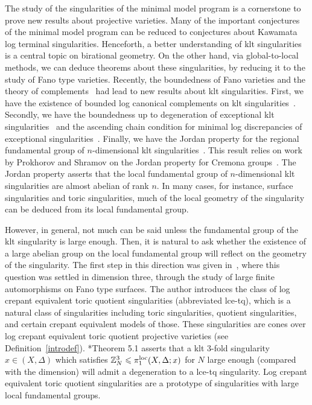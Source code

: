 \documentclass{amsart}
\newcommand{\zz}{\mathbb{Z}}
\theoremstyle{remark}
\numberwithin{equation}{section}
\begin{document}
The study of the singularities of the minimal model program
is a cornerstone to prove new results about projective varieties.
Many of the important conjectures of the minimal model program
can be reduced to conjectures about Kawamata log terminal singularities.
Henceforth, a better understanding of klt singularities is a central topic on birational geometry.
On the other hand, via global-to-local methods, we can deduce theorems about
these singularities, 
by reducing it to the study of Fano type varieties.
Recently, the boundedness of Fano varieties and the theory of complements~\cites{Bir16a,Bir16b}
had lead to new results about klt singularities.
First, we have the existence of bounded log canonical complements
on klt singularities~\cite{Bir16a}.
Secondly, we have the boundedness up to degeneration of exceptional klt singularities~\cites{Mor18b,HLM19} and the ascending chain condition for minimal log discrepancies
of exceptional singularities~\cites{Mor18a,HLS19}.
Finally, we have the Jordan property for the regional fundamental group of $n$-dimensional klt singularities~\cite{BFMS20}.
This result relies on work by Prokhorov and Shramov
on the Jordan property for Cremona groups~\cites{PS14,PS16}.
The Jordan property asserts that the local fundamental group of $n$-dimensional klt singularities are almost abelian of rank $n$. 
In many cases, for instance, surface singularities and toric singularities, 
much of the local geometry of the singularity can be deduced from its
local fundamental group.

However, in general, not much can be said unless the fundamental group of the klt singularity is large enough.
Then, it is natural to ask whether the existence of a large abelian group on the local fundamental group will reflect on the geometry of the singularity.
The first step in this direction was given in~\cite{Mor20}, where this question
was settled in dimension three, through the study of 
large finite automorphisms on Fano type surfaces.
The author introduces the class of log crepant equivalent  toric quotient singularities (abbreviated lce-tq), which is a natural class of singularities including
toric singularities, quotient singularities, and certain crepant equivalent  models of those.
These singularities are cones over log crepant equivalent  toric quotient projective varieties (see Definition~\ref{introdef}).
\cite{Mor20}*{Theorem 5.1} asserts that a klt $3$-fold singularity
$x\in (X,\Delta)$ which satisfies $\zz_N^3\leqslant \pi_1^{\rm loc}(X,\Delta;x)$
for $N$ large enough (compared with the dimension) will admit a degeneration
to a lce-tq singularity.
Log crepant equivalent  toric quotient singularities are a prototype of singularities with large local fundamental groups.
\end{document}
